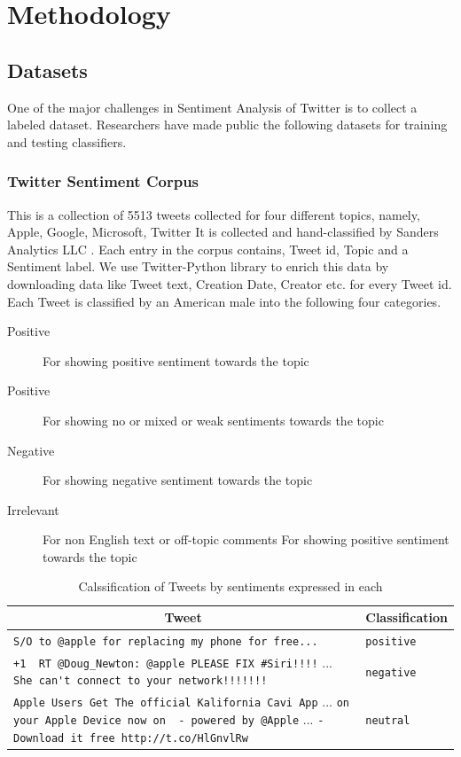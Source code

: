\section{Methodology}

\subsection{Datasets}
One of the major challenges in Sentiment Analysis of Twitter is to collect a labeled dataset.
Researchers have made public the following datasets for training and testing classifiers.

\subsubsection{Twitter Sentiment Corpus}
This is a collection of 5513 tweets collected for four different topics, namely, Apple, Google, Microsoft, Twitter
It is collected and hand-classified by Sanders Analytics LLC \cite{SA}.
Each entry in the corpus contains, Tweet id, Topic and a Sentiment label.
We use Twitter-Python library to enrich this data by downloading data like Tweet text, Creation Date, Creator etc. for every Tweet id. %
Each Tweet is classified by an American male into the following four categories.

\begin{description}
	\item[Positive] {For showing positive sentiment towards the topic}
	\item[Positive] {For showing no or mixed or weak sentiments towards the topic}
	\item[Negative] {For showing negative sentiment towards the topic}	
	\item[Irrelevant] {For non English text or off-topic comments}
	{For showing positive sentiment towards the topic}
\end{description}

\begin{table}[h]
\centering
	\begin{tabular}{| p{} | l | }
	\hline
		\multicolumn{1}{|c|}{Tweet} &
		\multicolumn{1}{|c|}{Classification} \\
	\hline
	\verb'S/O to @apple for replacing my phone for free...' &  \verb'positive' \\ \hline
	
	\verb"+1  RT @Doug_Newton: @apple PLEASE FIX #Siri!!!!" {...}
	\verb"She can't connect to your network!!!!!!!" &  \verb'negative' \\ \hline
	
	\verb'Apple Users Get The official Kalifornia Cavi App' {...}
	\verb'on your Apple Device now on  - powered by @Apple' {...}
	\verb'- Download it free http://t.co/HlGnvlRw' &  \verb'neutral' \\ \hline
	
	\end{tabular}
\caption{Calssification of Tweets by sentiments expressed in each}
\label{table:twt}
\end{table}

